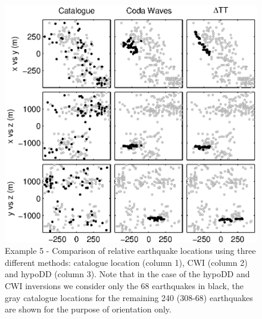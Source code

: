 \documentclass[extra, onecolumn, doublespacing]{gji}
\begin{document}
\begin{figure}
\includegraphics{Figure6_bw.eps}
\caption{Example 5 - Comparison of relative earthquake locations
using three different methods: catalogue location (column 1), CWI
(column 2) and hypoDD (column 3). Note that in the case of the
hypoDD and CWI inversions we consider only the 68 earthquakes in
black, the gray catalogue locations for the remaining 240 (308-68)
earthquakes are shown for the purpose of orientation only.}
\label{fig-69Calaverasevents_eg1}
\end{figure}
\end{document}
